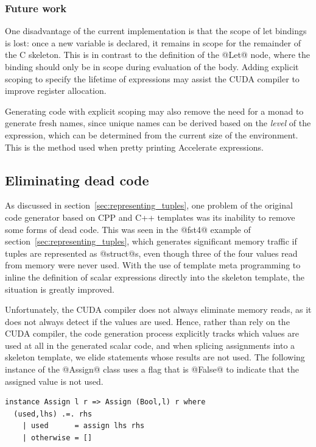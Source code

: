 \subsubsection{Future work}

One disadvantage of the current implementation is that the scope of let bindings
is lost: once a new variable is declared, it remains in scope for the remainder
of the C skeleton. This is in contrast to the definition of the @Let@ \AST
node, where the binding should only be in scope during evaluation of the body.
Adding explicit scoping to specify the lifetime of expressions may assist the
CUDA compiler to improve register allocation.


Generating code with explicit scoping may also remove the need for a monad to
generate fresh names, since unique names can be derived based on the  \emph{level} of the expression, which can be determined from the current
size of the environment. This is the method used when pretty printing Accelerate
expressions.


\subsection{Eliminating dead code}
\label{sec:eliminating_dead_code}

As discussed in section~\ref{sec:representing_tuples}, one problem of the
original code generator based on CPP and C++ templates was its inability to
remove some forms of dead code. This was seen in the @fst4@ example of
section~\ref{sec:representing_tuples}, which generates significant memory
traffic if tuples are represented as @struct@s, even though three of the
four values read from memory were never used. With the use of template meta
programming to inline the definition of scalar expressions directly into the
skeleton template, the situation is greatly improved.

Unfortunately, the CUDA compiler does not always eliminate memory reads, as it
does not always detect if the values are used. Hence, rather than rely on the
CUDA compiler, the code generation process explicitly tracks which values are
used at all in the generated scalar code, and when splicing assignments into a
skeleton template, we elide statements whose results are not used. The following
instance of the @Assign@ class uses a flag that is @False@ to indicate
that the assigned value is not used.
%
\begin{lstlisting}[style=haskell]
instance Assign l r => Assign (Bool,l) r where
  (used,lhs) .=. rhs
    | used      = assign lhs rhs
    | otherwise = []
\end{lstlisting}

